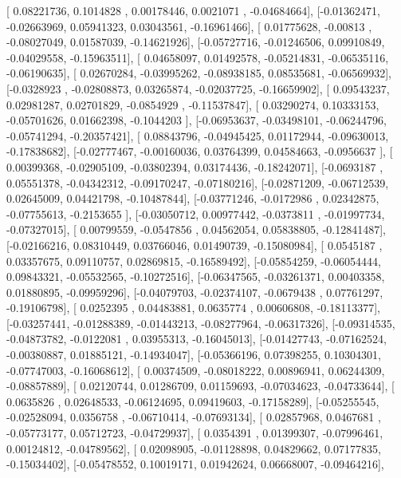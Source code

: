 \documentclass{article}
\begin{document}
       [ 0.08221736,  0.1014828 ,  0.00178446,  0.0021071 , -0.04684664],
       [-0.01362471, -0.02663969,  0.05941323,  0.03043561, -0.16961466],
       [ 0.01775628, -0.00813   , -0.08027049,  0.01587039, -0.14621926],
       [-0.05727716, -0.01246506,  0.09910849, -0.04029558, -0.15963511],
       [ 0.04658097,  0.01492578, -0.05214831, -0.06535116, -0.06190635],
       [ 0.02670284, -0.03995262, -0.08938185,  0.08535681, -0.06569932],
       [-0.0328923 , -0.02808873,  0.03265874, -0.02037725, -0.16659902],
       [ 0.09543237,  0.02981287,  0.02701829, -0.0854929 , -0.11537847],
       [ 0.03290274,  0.10333153, -0.05701626,  0.01662398, -0.1044203 ],
       [-0.06953637, -0.03498101, -0.06244796, -0.05741294, -0.20357421],
       [ 0.08843796, -0.04945425,  0.01172944, -0.09630013, -0.17838682],
       [-0.02777467, -0.00160036,  0.03764399,  0.04584663, -0.0956637 ],
       [ 0.00399368, -0.02905109, -0.03802394,  0.03174436, -0.18242071],
       [-0.0693187 ,  0.05551378, -0.04342312, -0.09170247, -0.07180216],
       [-0.02871209, -0.06712539,  0.02645009,  0.04421798, -0.10487844],
       [-0.03771246, -0.0172986 ,  0.02342875, -0.07755613, -0.2153655 ],
       [-0.03050712,  0.00977442, -0.0373811 , -0.01997734, -0.07327015],
       [ 0.00799559, -0.0547856 ,  0.04562054,  0.05838805, -0.12841487],
       [-0.02166216,  0.08310449,  0.03766046,  0.01490739, -0.15080984],
       [ 0.0545187 ,  0.03357675,  0.09110757,  0.02869815, -0.16589492],
       [-0.05854259, -0.06054444,  0.09843321, -0.05532565, -0.10272516],
       [-0.06347565, -0.03261371,  0.00403358,  0.01880895, -0.09959296],
       [-0.04079703, -0.02374107, -0.0679438 ,  0.07761297, -0.19106798],
       [ 0.0252395 ,  0.04483881,  0.0635774 ,  0.00606808, -0.18113377],
       [-0.03257441, -0.01288389, -0.01443213, -0.08277964, -0.06317326],
       [-0.09314535, -0.04873782, -0.0122081 ,  0.03955313, -0.16045013],
       [-0.01427743, -0.07162524, -0.00380887,  0.01885121, -0.14934047],
       [-0.05366196,  0.07398255,  0.10304301, -0.07747003, -0.16068612],
       [ 0.00374509, -0.08018222,  0.00896941,  0.06244309, -0.08857889],
       [ 0.02120744,  0.01286709,  0.01159693, -0.07034623, -0.04733644],
       [ 0.0635826 ,  0.02648533, -0.06124695,  0.09419603, -0.17158289],
       [-0.05255545, -0.02528094,  0.0356758 , -0.06710414, -0.07693134],
       [ 0.02857968,  0.0467681 , -0.05773177,  0.05712723, -0.04729937],
       [ 0.0354391 ,  0.01399307, -0.07996461,  0.00124812, -0.04789562],
       [ 0.02098905, -0.01128898,  0.04829662,  0.07177835, -0.15034402],
       [-0.05478552,  0.10019171,  0.01942624,  0.06668007, -0.09464216],
\end{document}
